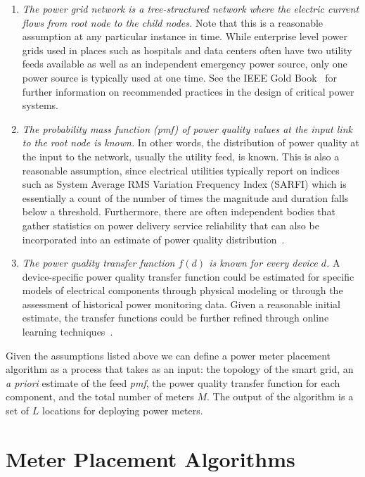 \begin{enumerate}
\item \emph{The power grid network is a tree-structured network where the electric current flows from root node to the child nodes.}
Note that this is a 
reasonable assumption at any particular instance in time. While enterprise level power grids used in places such as hospitals and data centers often have two utility feeds available as well as an independent emergency power source, only one power source is typically used at one time. See the IEEE Gold Book~\cite{goldbook} for further information on recommended practices in the design of critical power systems. 

\item \emph{The probability mass function (\emph{pmf}) of power quality values at the input link to the root node is known.} In other words, the distribution of power quality at the input to the network, usually the utility feed, is known.
This is also a reasonable assumption, since electrical utilities typically report on indices such as System Average RMS Variation Frequency Index (SARFI) which is essentially a count of the number of times the magnitude and duration falls below a threshold.  
Furthermore, there are often independent bodies that gather statistics on power delivery service reliability that can also be incorporated into an estimate of power quality distribution~\cite{chowdhury2004reliability}. 

\item \emph{The power quality transfer function $f(d)$ is known for every device $d$.}  
A device-specific power quality transfer function could be estimated for specific models of electrical components 
through physical modeling or through the assessment of historical power monitoring data. 
Given a reasonable initial estimate, 
the transfer functions could be further refined through online learning techniques~\cite{catherine_pri}. 
\end{enumerate}

Given the assumptions listed above we can define a power meter placement algorithm as a process that takes as 
an input: the topology of the smart grid, an \textit{a priori} estimate of the feed \emph{pmf}, the power quality transfer function for each component, and the total number of meters $M$. The output of the algorithm is a set of $L$ locations for deploying power meters. 

\section{Meter Placement Algorithms}
